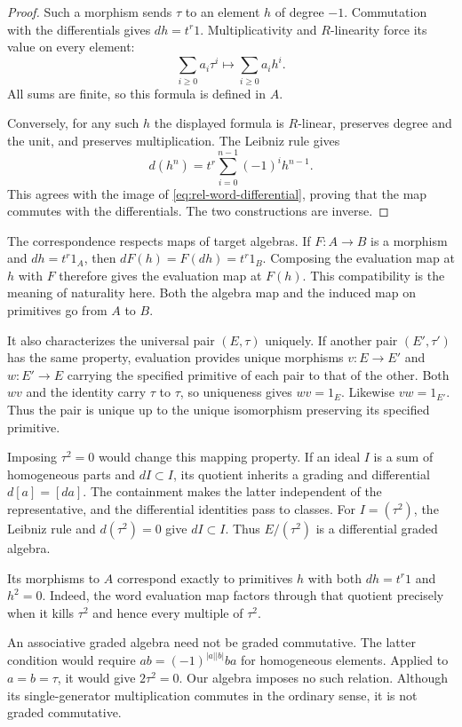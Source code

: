 \begin{proof}
Such a morphism sends $\tau$ to an element $h$ of degree $-1$.
Commutation with the differentials gives $dh=t^r1$.
Multiplicativity and $R$-linearity force its value on every element:
\[
 \sum_{i\geq0}a_i\tau^i\longmapsto\sum_{i\geq0}a_i h^i.
\]
All sums are finite, so this formula is defined in $A$.

Conversely, for any such $h$ the displayed formula is $R$-linear,
preserves degree and the unit, and preserves multiplication.
The Leibniz rule gives
\[
 d(h^n)=t^r\sum_{i=0}^{n-1}(-1)^i h^{n-1}.
\]
This agrees with the image of
\eqref{eq:rel-word-differential}, proving that the map commutes with
the differentials. The two constructions are inverse.
\end{proof}

The correspondence respects maps of target algebras.
If $F:A\to B$ is a morphism and $dh=t^r1_A$, then
$dF(h)=F(dh)=t^r1_B$. Composing the evaluation map at $h$ with $F$
therefore gives the evaluation map at $F(h)$.
This compatibility is the meaning of naturality here. Both the algebra map and the induced map on primitives go from
$A$ to $B$.

It also characterizes the universal pair $(E,\tau)$ uniquely.
If another pair $(E',\tau')$ has the same property, evaluation provides
unique morphisms $v:E\to E'$ and $w:E'\to E$ carrying the specified
primitive of each pair to that of the other. Both $wv$ and the identity carry $\tau$ to $\tau$, so
uniqueness gives $wv=1_E$. Likewise $vw=1_{E'}$.
Thus the pair is unique up to the unique isomorphism preserving its
specified primitive.

Imposing $\tau^2=0$ would change this mapping property.
If an ideal $I$ is a sum of homogeneous parts and $dI\subset I$, its
quotient inherits a grading and differential $d[a]=[da]$.
The containment makes the latter independent of the representative,
and the differential identities pass to classes.
For $I=(\tau^2)$, the Leibniz rule and $d(\tau^2)=0$ give $dI\subset I$.
Thus $E/(\tau^2)$ is a differential graded algebra.

Its morphisms to $A$ correspond exactly to primitives
$h$ with both $dh=t^r1$ and $h^2=0$.
Indeed, the word evaluation map factors through that quotient precisely
when it kills $\tau^2$ and hence every multiple of $\tau^2$.

An associative graded algebra need not be graded commutative.
The latter condition would require $ab=(-1)^{|a||b|}ba$ for homogeneous
elements. Applied to $a=b=\tau$, it would give $2\tau^2=0$.
Our algebra imposes no such relation. Although its single-generator
multiplication commutes in the ordinary sense, it is not graded
commutative.


